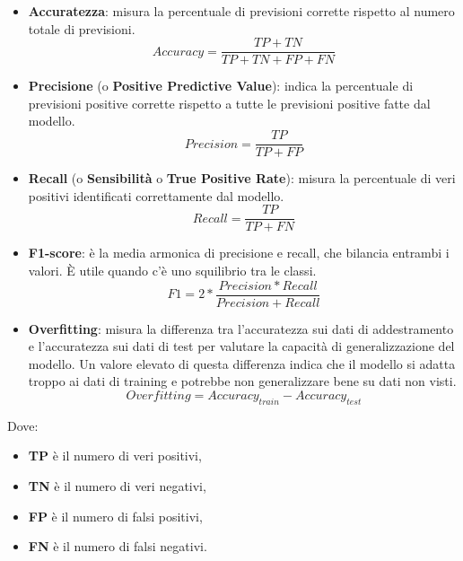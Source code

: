 \begin{itemize}
    \item \textbf{Accuratezza}: misura la percentuale di previsioni corrette rispetto al numero totale di previsioni.
    \begin{equation} Accuracy = \frac{TP+TN}{TP+TN+FP+FN}\end{equation}

    \item \textbf{Precisione} (o \textbf{Positive Predictive Value}): indica la percentuale di previsioni positive corrette rispetto a tutte le previsioni positive fatte dal modello.
    \begin{equation} Precision = \frac{TP}{TP+FP}\end{equation}

    \item \textbf{Recall} (o \textbf{Sensibilità} o \textbf{True Positive Rate}): misura la percentuale di veri positivi identificati correttamente dal modello.
    \begin{equation} Recall = \frac{TP}{TP+FN}\end{equation}

    \item \textbf{F1-score}: è la media armonica di precisione e recall, che bilancia entrambi i valori. È utile quando c'è uno squilibrio tra le classi.\begin{equation} F1 = 2* \frac{Precision*Recall}{Precision+Recall}\end{equation}

    \item \textbf{Overfitting}: misura la differenza tra l'accuratezza sui dati di addestramento e l'accuratezza sui dati di test per valutare la capacit\`a di generalizzazione del modello. Un valore elevato di questa differenza indica che il modello si adatta troppo ai dati di training e potrebbe non generalizzare bene su dati non visti.\begin{equation}Overfitting = Accuracy_{train} - Accuracy_{test}\end{equation}
\end{itemize}

Dove:
\begin{itemize}
    \item \textbf{TP} è il numero di veri positivi,
    \item \textbf{TN} è il numero di veri negativi,
    \item \textbf{FP} è il numero di falsi positivi,
    \item \textbf{FN} è il numero di falsi negativi.
\end{itemize}

